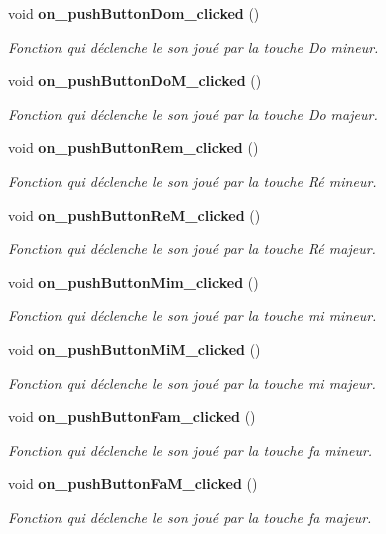 \begin{DoxyCompactItemize}
\item 
void {\bf on\-\_\-push\-Button\-Dom\-\_\-clicked} ()
\begin{DoxyCompactList}\small\item\em Fonction qui déclenche le son joué par la touche Do mineur. \end{DoxyCompactList}\item 
void {\bf on\-\_\-push\-Button\-Do\-M\-\_\-clicked} ()
\begin{DoxyCompactList}\small\item\em Fonction qui déclenche le son joué par la touche Do majeur. \end{DoxyCompactList}\item 
void {\bf on\-\_\-push\-Button\-Rem\-\_\-clicked} ()
\begin{DoxyCompactList}\small\item\em Fonction qui déclenche le son joué par la touche Ré mineur. \end{DoxyCompactList}\item 
void {\bf on\-\_\-push\-Button\-Re\-M\-\_\-clicked} ()
\begin{DoxyCompactList}\small\item\em Fonction qui déclenche le son joué par la touche Ré majeur. \end{DoxyCompactList}\item 
void {\bf on\-\_\-push\-Button\-Mim\-\_\-clicked} ()
\begin{DoxyCompactList}\small\item\em Fonction qui déclenche le son joué par la touche mi mineur. \end{DoxyCompactList}\item 
void {\bf on\-\_\-push\-Button\-Mi\-M\-\_\-clicked} ()
\begin{DoxyCompactList}\small\item\em Fonction qui déclenche le son joué par la touche mi majeur. \end{DoxyCompactList}\item 
void {\bf on\-\_\-push\-Button\-Fam\-\_\-clicked} ()
\begin{DoxyCompactList}\small\item\em Fonction qui déclenche le son joué par la touche fa mineur. \end{DoxyCompactList}\item 
void {\bf on\-\_\-push\-Button\-Fa\-M\-\_\-clicked} ()
\begin{DoxyCompactList}\small\item\em Fonction qui déclenche le son joué par la touche fa majeur. \end{DoxyCompactList}\item 

\end{DoxyCompactItemize}
